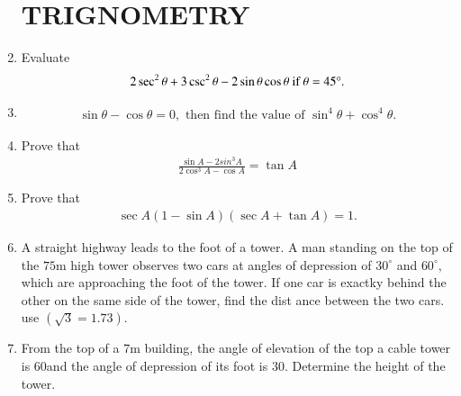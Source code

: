 \documentclass[12pt,-letter paper]{article}
\providecommand{\brak}[1]{\ensuremath{\left(#1\right)}}
\begin{document}
\begin{enumerate}
\section*{TRIGNOMETRY}
\item
Evaluate \begin{align}
2\sec^2\theta + 3\csc^2\theta - 2\sin\theta\cos\theta  \ \text{if} \ \theta = 45\degree.
\end{align}
\item 
{} \begin{align} 
\sin\theta - \cos\theta = 0, \text{ then find the value of }\sin^4\theta + \cos^4\theta.
\end{align}
\item
Prove that \begin{align} \frac{\sin{A}-2sin^3{A}}{2\cos^3{A}-\cos{A}}=\tan{A} \end{align}
\item
Prove that \begin{align} \sec{A\brak{1-\sin{A}}\brak{\sec{A}+\tan{A}}}=1. \end{align}
\item
	A straight highway leads to the foot of a tower. A man standing on the top of the $75 \mathrm{m}$ high tower observes two cars at angles of depression of $30^\circ$ and $60^\circ$, which are approaching the foot of the tower. If one car is exactky behind the other on the same side of the tower, find the dist
ance between the two cars. use \brak{\sqrt{3}=1.73}.
\item
	From the top of a $7 \mathrm{m}$ building, the angle of elevation of the top a cable tower is 60\degree and the angle of depression of its foot is 30\degree. Determine the height of the tower.

\end{enumerate}
\end{document}
